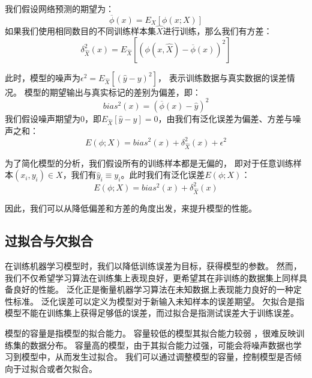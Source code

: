 我们假设网络预测的期望为：
\begin{equation}
	\label{eqt_5_3}
	\overline{\phi}(x) = E_X\left[ \phi(x; X) \right]
\end{equation}
如果我们使用相同数目的不同训练样本集$\hat{X}$进行训练，那么我们有方差：
\begin{equation}
	\label{eqt_5_4}
	\delta_{\hat{X}}^2(x) = E_{\hat{X}}\left[ (\phi(x, \hat{X}) - \overline{\phi}(x))^2\right]
\end{equation}

此时，模型的噪声为$\epsilon^2 = E_{\hat{X}}\left[ (\hat{y} - y)^2\right]$，
表示训练数据与真实数据的误差情况。
模型的期望输出与真实标记的差别为偏差，即：
\begin{equation}
	bias^2(x) = (\overline{\phi}(x)  - \hat{y})^2
\end{equation}
我们假设噪声期望为$0$，即$E_{\hat{X}}[\hat{y} - y] = 0$，由\cite{周志华2016机器学习}我们有泛化误差为偏差、方差与噪声之和：
\begin{equation}
	E(\phi; X) = bias^2(x) + \delta_{\hat{X}}^2(x) + \epsilon^2
\end{equation}

为了简化模型的分析，我们假设所有的训练样本都是无偏的，
即对于任意训练样本$(x_i, y_i) \in X$，我们有$\hat{y}_i \equiv y_i$。此时我们有泛化误差$E(\phi; X) $：
\begin{equation}
	E(\phi; X) = bias^2(x) + \delta_{\hat{X}}^2(x) 
\end{equation}

因此，我们可以从降低偏差和方差的角度出发，来提升模型的性能。

\subsection{过拟合与欠拟合}

在训练机器学习模型时，我们以降低训练误差为目标，获得模型的参数。
然而，我们不仅希望学习算法在训练集上表现良好，更希望其在非训练的数据集上同样具备良好的性能。
泛化正是衡量机器学习算法在未知数据上表现能力良好的一种定性标准。
泛化误差可以定义为模型对于新输入未知样本的误差期望。
欠拟合是指模型不能在训练集上获得足够低的误差，而过拟合是指测试误差大于训练误差。\par

模型的容量是指模型的拟合能力。
容量较低的模型其拟合能力较弱 ，很难反映训练集的数据分布。
容量高的模型，由于其拟合能力过强，可能会将噪声数据也学习到模型中，从而发生过拟合。
我们可以通过调整模型的容量，控制模型是否倾向于过拟合或者欠拟合。\par

